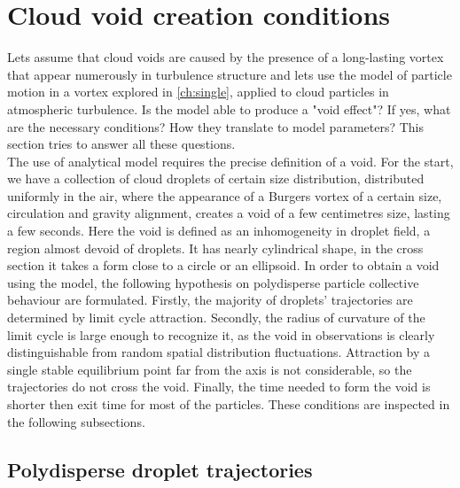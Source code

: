 \documentclass[../main.tex]{subfiles}
\begin{document}
\section{Cloud void creation conditions}
\label{ch4s2}
Lets assume that cloud voids are caused by the presence of a long-lasting vortex that appear numerously in turbulence structure and lets use the model of particle motion in a vortex explored in \autoref{ch:single}, applied to cloud particles in atmospheric turbulence. Is the model able to produce a "void effect"? If yes, what are the necessary conditions? How they translate to model parameters? This section tries to answer all these questions.\\
The use of analytical model requires the precise definition of a void. For the start, we have a collection of cloud droplets of certain size distribution, distributed uniformly in the air, where the appearance of a Burgers vortex of a certain size, circulation and gravity alignment, creates a void of a few centimetres size, lasting a few seconds. Here the void is defined as an inhomogeneity in droplet field, a region almost devoid of droplets. It has nearly cylindrical shape, in the cross section it takes a form close to a circle or an ellipsoid. In order to obtain a void using the model, the following hypothesis on polydisperse particle collective behaviour are formulated. Firstly, the majority of droplets' trajectories are determined by limit cycle attraction. Secondly, the radius of curvature of the limit cycle is large enough to recognize it, as the void in observations is clearly distinguishable from random spatial distribution fluctuations. Attraction by a single stable equilibrium point far from the axis is not considerable, so the trajectories do not cross the void. Finally, the time needed to form the void is shorter then exit time for most of the particles. These conditions are inspected in the following subsections.

\subsection{Polydisperse droplet trajectories}
\label{ssec:poly}
\end{document}
